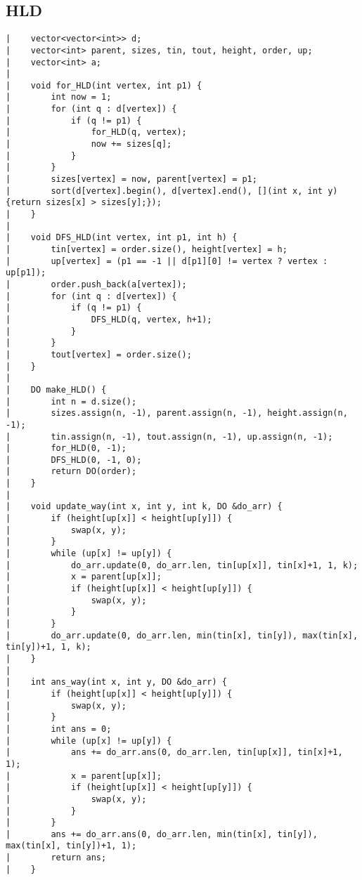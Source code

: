 \documentclass[a4paper, 10pt]{article}
\begin{document}
\begin{center}
\section*{HLD}
\begin{verbatim}
|    vector<vector<int>> d;
|    vector<int> parent, sizes, tin, tout, height, order, up;
|    vector<int> a;
|    
|    void for_HLD(int vertex, int p1) {
|        int now = 1;
|        for (int q : d[vertex]) {
|            if (q != p1) {
|                for_HLD(q, vertex);
|                now += sizes[q];
|            }
|        }
|        sizes[vertex] = now, parent[vertex] = p1;
|        sort(d[vertex].begin(), d[vertex].end(), [](int x, int y) {return sizes[x] > sizes[y];});
|    }
|    
|    void DFS_HLD(int vertex, int p1, int h) {
|        tin[vertex] = order.size(), height[vertex] = h;
|        up[vertex] = (p1 == -1 || d[p1][0] != vertex ? vertex : up[p1]);
|        order.push_back(a[vertex]);
|        for (int q : d[vertex]) {
|            if (q != p1) {
|                DFS_HLD(q, vertex, h+1);
|            }
|        }
|        tout[vertex] = order.size();
|    }
|    
|    DO make_HLD() {
|        int n = d.size();
|        sizes.assign(n, -1), parent.assign(n, -1), height.assign(n, -1);
|        tin.assign(n, -1), tout.assign(n, -1), up.assign(n, -1);
|        for_HLD(0, -1);
|        DFS_HLD(0, -1, 0);
|        return DO(order);
|    }
|    
|    void update_way(int x, int y, int k, DO &do_arr) {
|        if (height[up[x]] < height[up[y]]) {
|            swap(x, y);
|        }
|        while (up[x] != up[y]) {
|            do_arr.update(0, do_arr.len, tin[up[x]], tin[x]+1, 1, k);
|            x = parent[up[x]];
|            if (height[up[x]] < height[up[y]]) {
|                swap(x, y);
|            }
|        }
|        do_arr.update(0, do_arr.len, min(tin[x], tin[y]), max(tin[x], tin[y])+1, 1, k);
|    }
|    
|    int ans_way(int x, int y, DO &do_arr) {
|        if (height[up[x]] < height[up[y]]) {
|            swap(x, y);
|        }
|        int ans = 0;
|        while (up[x] != up[y]) {
|            ans += do_arr.ans(0, do_arr.len, tin[up[x]], tin[x]+1, 1);
|            x = parent[up[x]];
|            if (height[up[x]] < height[up[y]]) {
|                swap(x, y);
|            }
|        }
|        ans += do_arr.ans(0, do_arr.len, min(tin[x], tin[y]), max(tin[x], tin[y])+1, 1);
|        return ans;
|    }
\end{verbatim}


\end{center}
\end{document}
